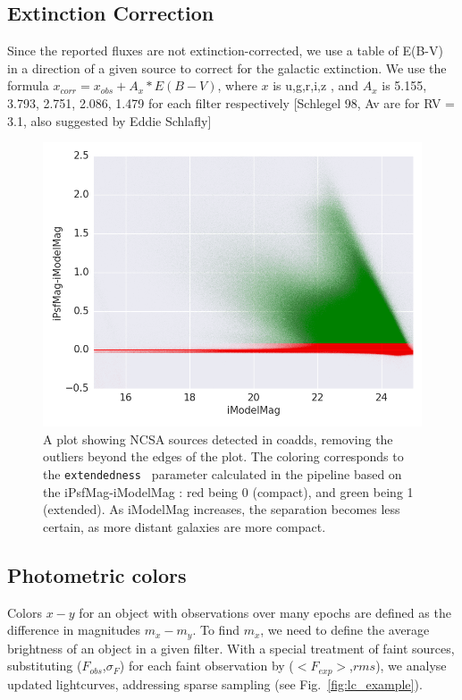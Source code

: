 \documentclass[fleqn,usenatbib]{mnras}  %
\begin{document}
\subsection{Extinction Correction}

Since the reported fluxes are not extinction-corrected, we use a table of E(B-V) in a direction of a given source to correct for the galactic extinction. We use the formula  $x_{corr}  = x_{obs} + A_{x} * E(B-V)$, where $x$ is  u,g,r,i,z , and $A_x$ is 5.155, 3.793, 2.751, 2.086, 1.479  for each filter respectively  [Schlegel 98, Av are for RV = 3.1, also suggested by Eddie Schlafly] 




\begin{figure}
\label{fig:coadds_ext}
 \includegraphics[width=\columnwidth]{Extendedness_coadd_data_16520093_srcs_lim.png}
 \cprotect\caption{A plot showing NCSA sources detected in coadds, removing the outliers beyond the edges of the plot. The coloring corresponds to the \verb|extendedness | parameter calculated in the pipeline based on the iPsfMag-iModelMag : red being 0 (compact), and green being 1 (extended). As iModelMag increases, the separation becomes less certain, as more distant galaxies are more compact.  }
\end{figure}
% 
\subsection{Photometric colors}

Colors $x-y$ for an object with observations over many epochs are defined as the difference in magnitudes $m_{x} - m_{y}$. To find $m_{x}$, we need to define the average brightness of an object in  a given filter. With a special treatment of faint sources, substituting ($F_{obs}$,$\sigma_F$) for each faint observation by ($<F_{exp}>$,$rms$), we analyse updated lightcurves, addressing sparse sampling (see Fig.~\ref{fig:lc_example}).  
\end{document}
